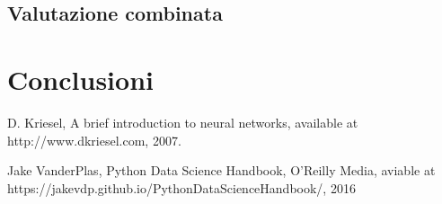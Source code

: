 \documentclass[a4paper,12pt]{report}
\begin{document}
\section{Valutazione combinata}

% 
% 
\chapter{Conclusioni}
\label{cap4}

%
%
\begin{thebibliography}{00}
%
%
D. Kriesel, A brief introduction to neural networks, available at
http://www.dkriesel.com, 2007. %
%

Jake VanderPlas, Python Data Science Handbook, O'Reilly Media, aviable at
https://jakevdp.github.io/PythonDataScienceHandbook/, 2016


\end{thebibliography}
% 
\end{document}
